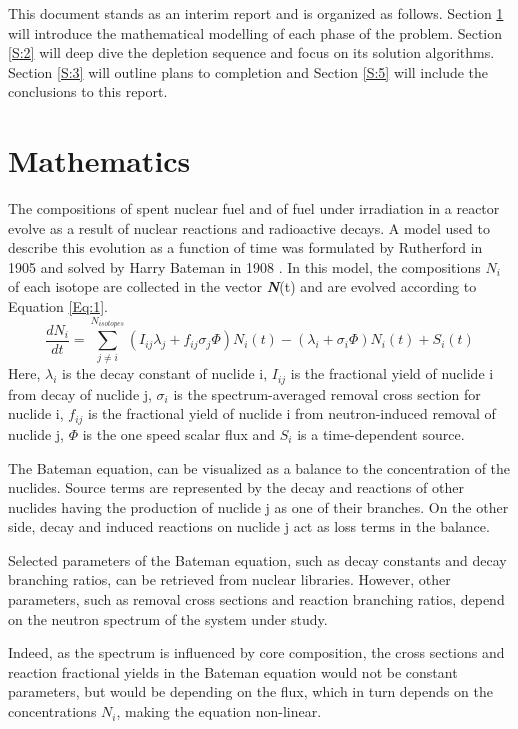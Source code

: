 \documentclass[a4paper,titlepage]{article}
\begin{document}
This document stands as an interim report and is organized as follows.
Section \ref{S:1} will introduce the mathematical modelling of each phase of the problem. Section \ref{S:2} will deep dive the depletion sequence and focus on its solution algorithms. Section \ref{S:3} will outline plans to completion and Section \ref{S:5} will include the conclusions to this report.
\section{Mathematics}
\label{S:1}
The compositions of spent nuclear fuel and of fuel under irradiation in a reactor evolve as a result of nuclear reactions and radioactive decays. A model used to describe this evolution as a function of time was formulated by Rutherford in 1905 \cite{rutherford1905radio} and solved by Harry Bateman in 1908 \cite{bateman1908solution}. In this model, the compositions ${N_{i}}$ of each isotope are collected in the vector \textbf{\textit{N}}(t) and are evolved according to Equation \ref{Eq:1}.
\begin{equation}
    \frac{dN_{i}}{dt}=\sum_{j\neq i}^{N_{isotopes}}(I_{ij}\lambda_j+f_{ij}\sigma_j\Phi)N_i(t)-(\lambda_i+\sigma_i\Phi)N_i(t) + S_i(t)
    \label{Eq:1}
\end{equation}
Here, $\lambda_{i}$ is the decay constant of nuclide i, $I_{ij}$ is the fractional yield of nuclide i from decay of nuclide j, $\sigma_i$ is the spectrum-averaged removal cross section for nuclide i, $f_{ij}$ is the fractional yield of nuclide i from neutron-induced removal of nuclide j, $\Phi$ is the one speed scalar flux and $S_i$ is a time-dependent source.

The Bateman equation, can be visualized as a balance to the concentration of the nuclides. Source terms are represented by the decay and reactions of other nuclides having the production of nuclide j as one of their branches. On the other side, decay and induced reactions on nuclide j act as loss terms in the balance.

Selected parameters of the Bateman equation, such as decay constants and decay branching ratios, can be retrieved from nuclear libraries. However, other parameters, such as removal cross sections and reaction branching ratios, depend on the neutron spectrum of the system under study.

Indeed, as the spectrum is influenced by core composition, the cross sections and reaction fractional yields in the Bateman equation would not be constant parameters, but would be depending on the flux, which in turn depends on the concentrations \textit{$N_i$}, making the equation non-linear.
\end{document}
